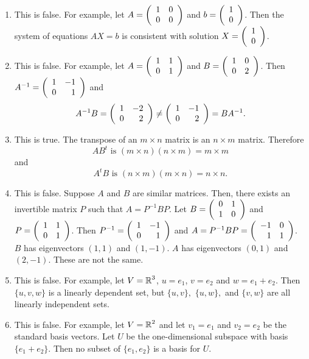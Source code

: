 \documentclass{ximera}
\begin{document}
\begin{exercise}
\begin{solution}
\soln \begin{enumerate}[label=(\alph*)]
\item This is false. For example, let $A=\left(\begin{array}{rrrrrrrrrrrrrrrrrr} 1 & 0 \\ 0 & 0 \end{array}\right)$ and $b=\left(\begin{array}{rrrrrrrrrrrrrrrrrr} 1\\0 \end{array}\right)$. Then the system of equations $AX=b$ is consistent with solution $X=\left(\begin{array}{rrrrrrrrrrrrrrrrrr} 1\\0 \end{array}\right)$. 

\item This is false. For example, let $A=\left(\begin{array}{rrrrrrrrrrrrrrrrrr} 1 & 1\\ 0 & 1 \end{array}\right)$ and $B=\left(\begin{array}{rrrrrrrrrrrrrrrrrr} 1 & 0\\ 0 & 2 \end{array}\right)$. Then $A^{-1}=\left(\begin{array}{rrrrrrrrrrrrrrrrrr} 1 & -1\\ 0 & 1 \end{array}\right)$ and 
\[
A^{-1}B = \left(\begin{array}{rrrrrrrrrrrrrrrrrr} 1 & -2\\ 0 & 2 \end{array}\right) \neq \left(\begin{array}{rrrrrrrrrrrrrrrrrr} 1 & -1\\ 0 & 2 \end{array}\right) = BA^{-1}.
\]

\item This is true.  The transpose of an $m\times n$ matrix is an $n\times m$ matrix. Therefore 
\[
AB^t \mbox{ is }  (m\times n)(n\times m) = m\times m
\]
and
\[
A^tB \mbox{ is }  (n\times m)(m\times n) = n\times n.
\]

\item This is false. Suppose $A$ and $B$ are similar matrices. Then, there exists an invertible matrix $P$ such that $A=P^{-1}BP$. Let $B=\left(\begin{array}{rrrrrrrrrrrrrrrrrr}  0 & 1 \\ 1 & 0 \end{array}\right)$ and $P=\left(\begin{array}{rrrrrrrrrrrrrrrrrr}  1 & 1 \\ 0 & 1 \end{array}\right)$. Then $P^{-1}=\left(\begin{array}{rrrrrrrrrrrrrrrrrr}  1 & -1 \\ 0 & 1 \end{array}\right)$ and $A=P^{-1}BP=\left(\begin{array}{rrrrrrrrrrrrrrrrrr}  -1 & 0 \\ 1 & 1 \end{array}\right)$. $B$ has eigenvectors $(1,1)$ and $(1,-1)$. $A$ has eigenvectors $(0,1)$ and $(2,-1)$. These are not the same. 

\item This is false. For example, let $V=\mbox{$\Bbb{R}$}^3$, $u=e_1$, $v=e_2$ and $w=e_1+e_2$. Then $\{u,v,w\}$ is a linearly dependent set, but $\{u,v\},$ $\{u,w\},$ and $\{v,w\}$ are all linearly independent sets.

\item This is false. For example, let $V=\mbox{$\Bbb{R}$}^2$ and let $v_1=e_1$ and $v_2=e_2$ be the standard basis vectors. Let $U$ be the one-dimensional subspace with basis $\{e_1+e_2\}$. Then no subset of $\{e_1,e_2\}$ is a basis for $U$.
\end{enumerate}
\end{solution}
\end{exercise}
\end{document}
